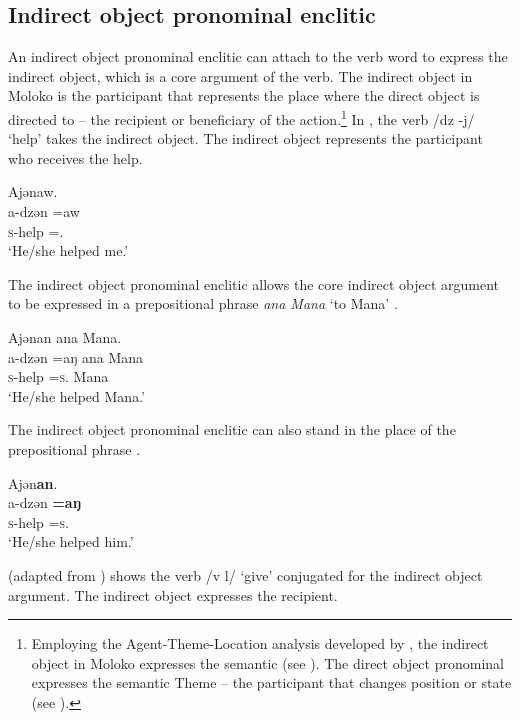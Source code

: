 \subsection{Indirect object pronominal enclitic}\label{sec:7.3.1.1}

An indirect object pronominal enclitic can attach to the verb word to express the indirect object, which is a core argument of the verb. The indirect object in Moloko is the participant that represents the place where the direct object is directed to – the recipient or beneficiary of the action.\footnote{Employing the Agent-Theme-Location analysis developed by \citet{DeLancey1991}, the indirect object in Moloko expresses the semantic \LOC (see ). The direct object pronominal expresses the semantic Theme -- the participant that changes position or state (see ).} In , the verb /dz -j/ ‘help’ takes the indirect object. The indirect object represents the participant who receives the help. 


\ea\label{ex:7:15}
Ajənaw.\\
\gll a-dzən =aw\\
\textsc{s}-help  ={\oneS}.{\IO}\\
\glt ‘He/she helped me.’
\z

The indirect object pronominal enclitic allows the core indirect object argument to be expressed in a prepositional phrase \textit{ana Mana} ‘to Mana’ . 

\ea\label{ex:7:16}
Ajənan ana Mana.\\
\gll a-dzən  =aŋ  ana  Mana\\
\textsc{s}-help  =\textsc{s}.{\IO}  {\DAT} Mana\\
\glt ‘He/she helped Mana.’
\z

The indirect object pronominal enclitic can also stand in the place of the prepositional phrase .

\ea\label{ex:7:17}
Ajən\textbf{an}.\\
\gll a-dzən  \textbf{=aŋ}\\
\textsc{s}-help  =\textsc{s}.{\IO}\\
\glt ‘He/she helped him.’
\z

 (adapted from \citealt{FriesenMamalis2008}) shows the verb /v l/ ‘give’ conjugated for the indirect object argument. The indirect object expresses the recipient.

